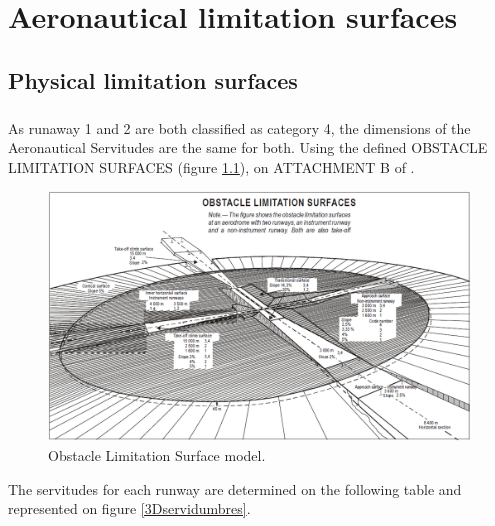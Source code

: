 \chapter{Aeronautical limitation surfaces}

	\section{Physical limitation surfaces}
	\paragraph{} As runaway 1 and 2 are both classified as category 4, the dimensions of the Aeronautical Servitudes are the same for both. Using the defined OBSTACLE LIMITATION SURFACES (figure \ref{servitudeMap}), on ATTACHMENT B of \cite{Standards2016}.
	
	\begin{figure}[H]
		\centering
		\includegraphics[clip, trim=0cm 0cm 0cm 0cm, width=\textwidth]{./images/servidumbres/servitudeMap}
		\caption{Obstacle Limitation Surface model.}
		\label{servitudeMap}
	\end{figure}

	The servitudes for each runway are determined on the following table and represented on figure \ref{3Dservidumbres}.
	
